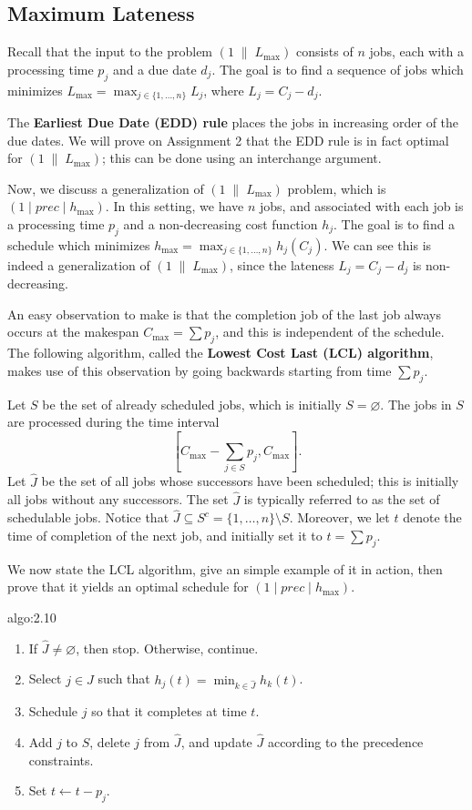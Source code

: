 \subsection{Maximum Lateness}\label{subsec:2.3}
Recall that the input to the problem $(1\;\|\;L_{\max})$ consists of 
$n$ jobs, each with a processing time $p_j$ and a due date $d_j$. 
The goal is to find a sequence of jobs which minimizes $L_{\max} = 
\max_{j\in\{1,\dots,n\}} L_j$, where $L_j = C_j - d_j$. 

The {\bf Earliest Due Date (EDD) rule} places the jobs in increasing order 
of the due dates. We will prove on Assignment 2 that the EDD rule is in fact 
optimal for $(1\;\|\;L_{\max})$; this can be done using an interchange argument.

Now, we discuss a generalization of $(1\;\|\;L_{\max})$ problem, which is 
$(1 \mid prec \mid h_{\max})$. In this setting, we have $n$ jobs, and 
associated with each job is a processing time $p_j$ and a non-decreasing 
cost function $h_j$. The goal is to find a schedule which minimizes 
$h_{\max} = \max_{j\in\{1,\dots,n\}} h_j(C_j)$. We can see this is indeed a 
generalization of $(1\;\|\;L_{\max})$, since the lateness $L_j = C_j - d_j$ 
is non-decreasing. 

An easy observation to make is that the completion job of the last job 
always occurs at the makespan $C_{\max} = \sum p_j$, and this is independent 
of the schedule. The following algorithm, called the {\bf Lowest Cost Last (LCL) algorithm}, makes 
use of this observation by going backwards starting from time $\sum p_j$. 

Let $S$ be the set of already scheduled jobs, which is initially $S = \varnothing$. 
The jobs in $S$ are processed during the time interval 
\[ \left[ C_{\max} - \sum_{j\in S} p_j, C_{\max} \right]. \] 
Let $\hat J$ be the set of all jobs whose successors have been 
scheduled; this is initially all jobs without any successors. 
The set $\hat J$ is typically referred to as the set of schedulable jobs.
Notice that $\hat J \subseteq S^c = \{1, \dots, n\} \setminus S$. Moreover, 
we let $t$ denote the time of completion of the next job, and initially 
set it to $t = \sum p_j$. 

We now state the LCL algorithm, give an simple example of it in action, then 
prove that it yields an optimal schedule for $(1 \mid prec \mid h_{\max})$. 

\begin{algo}{algo:2.10}
    \begin{enumerate}
        \item If $\hat J \neq \varnothing$, then stop. Otherwise, continue. 
        \item Select $j \in \hat J$ such that $h_j(t) = \min_{k\in\hat J} 
        h_k(t)$. 
        \item Schedule $j$ so that it completes at time $t$. 
        \item Add $j$ to $S$, delete $j$ from $\hat J$, and update $\hat J$
        according to the precedence constraints. 
        \item Set $t \gets t - p_j$. 
    \end{enumerate}
\end{algo} 

